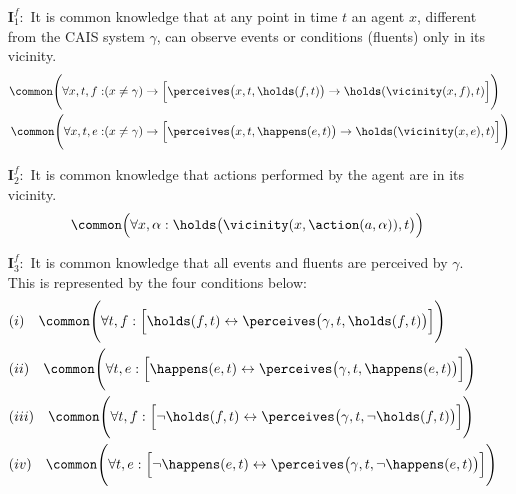 \begin{mdframed}[frametitle= Formal Requirements for $\mathcal{I}$ ,
  frametitlebackgroundcolor=gray!25, nobreak,
  linecolor=white,backgroundcolor=gray!10]
  \begin{enumerate}
  \item[$\mathbf{I}^f_1:$] It is common knowledge that at any
    point in time $t$ an agent $x$, different from the CAIS system
    $\gamma$, can observe events or conditions (fluents) only in
    its vicinity.
    \begin{equation*}
      \begin{aligned}
        \common\Bigg(\forall x, t, f:& (x \not = \gamma) \rightarrow \Big[\perceives\big(x, t, \holds(f, t)\big) \rightarrow
        \holds(\vicinity(x, f), t)\Big]\Bigg)\\
        \common\Bigg(\forall x, t, e:& (x \not = \gamma) \rightarrow \Big[\perceives\big(x, t, \happens(e, t)\big) \rightarrow
        \holds(\vicinity(x, e), t)\Big]\Bigg)\\
      \end{aligned}
    \end{equation*}

  \item[$\mathbf{I}^f_2:$] It is common knowledge that actions
    performed by the agent are in its vicinity.
    \begin{equation*}
      \common\Big(\forall x, \alpha:  \holds\big(\vicinity(x, \action(a, \alpha)), t\big)\Big)
    \end{equation*}
  \item[$\mathbf{I}^f_3:$] It is common knowledge that all events
    and fluents are perceived by $\gamma$.  This is represented by
    the four conditions below:
    \begin{equation*}
      \begin{aligned}
   &  (i) \hspace{10pt}  \common\Bigg(\forall  t, f:  \Big[\holds(f, t) \leftrightarrow \perceives\big(\gamma, t, \holds(f, t)\big) \Big]\Bigg)\\
   & (ii)  \hspace{10pt}   \common\Bigg(\forall  t, e: \Big[\happens(e, t)
        \leftrightarrow \perceives\big(\gamma, t, \happens(e,
        t)\big) \Big]\Bigg)\\
    &   (iii)  \hspace{10pt}   \common\Bigg(\forall  t, f:  \Big[\lnot \holds(f, t)
        \leftrightarrow \perceives\big(\gamma, t, \lnot \holds(f, t)\big) \Big]\Bigg)\\
    &   (iv) \hspace{10pt}    \common\Bigg(\forall  t, e:\Big[\lnot \happens(e, t)
        \leftrightarrow \perceives\big(\gamma, t, \lnot \happens(e, t)\big) \Big]\Bigg)
      \end{aligned}
    \end{equation*}
  \end{enumerate}
\end{mdframed}

